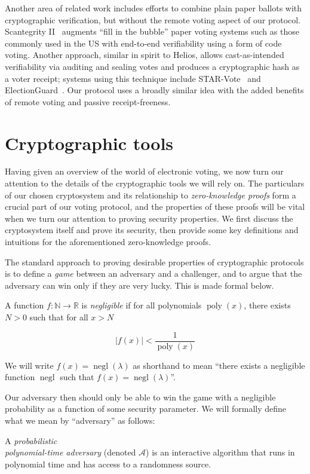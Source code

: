 \documentclass[12pt,a4paper]{article}
\DeclareMathOperator{\poly}{\text{poly}}
\DeclareMathOperator{\negl}{\text{negl}}
\theoremstyle{definition}
\begin{document}
Another area of related work includes efforts to combine plain paper ballots with cryptographic verification, but without the remote voting aspect of our protocol. Scantegrity II~\cite{chaum2008scantegrity} augments ``fill in the bubble'' paper voting systems such as those commonly used in the US with end-to-end verifiability using a form of code voting. Another approach, similar in spirit to Helios, allows cast-as-intended verifiability via auditing and sealing votes and produces a cryptographic hash as a voter receipt; systems using this technique include STAR-Vote~\cite{bell2013star} and ElectionGuard~\cite{electionguard}. Our protocol uses a broadly similar idea with the added benefits of remote voting and passive receipt-freeness.

\newpage
\section{Cryptographic tools}\label{sec-crypto}
Having given an overview of the world of electronic voting, we now turn our attention to the details of the cryptographic tools we will rely on. The particulars of our chosen cryptosystem and its relationship to \textit{zero-knowledge proofs} form a crucial part of our voting protocol, and the properties of these proofs will be vital when we turn our attention to proving security properties. We first discuss the cryptosystem itself and prove its security, then provide some key definitions and intuitions for the aforementioned zero-knowledge proofs.

The standard approach to proving desirable properties of cryptographic protocols is to define a \textit{game} between an adversary and a challenger, and to argue that the adversary can win only if they are very lucky. This is made formal below.
\begin{definition}
    A function $f:\mathbb{N}\rightarrow\mathbb{R}$ is \textit{negligible} if for all polynomials $\poly(x)$, there exists $N>0$ such that for all $x>N$

    $$|f(x)|<\frac{1}{\poly(x)}$$

    We will write $f(x)=\negl(\lambda)$ as shorthand to mean ``there exists a negligible function $\negl$ such that $f(x)=\negl(\lambda)$''.
\end{definition}

Our adversary then should only be able to win the game with a negligible probability as a function of some security parameter. We will formally define what we mean by ``adversary'' as follows:
\begin{definition}
    A \textit{probabilistic}\\\textit{polynomial-time adversary} (denoted $\mathcal{A}$) is an interactive algorithm that runs in polynomial time and has access to a randomness source.
\end{definition}
\end{document}
